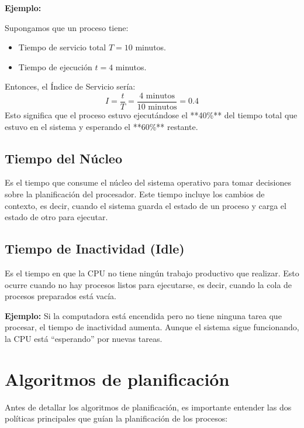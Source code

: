 \textbf{Ejemplo:}

Supongamos que un proceso tiene:
\begin{itemize}
	\item Tiempo de servicio total \( T = 10 \) minutos.
	\item Tiempo de ejecución \( t = 4 \) minutos.
\end{itemize}

Entonces, el Índice de Servicio sería:
\[
I = \frac{t}{T} = \frac{4 \text{ minutos}}{10 \text{ minutos}} = 0.4
\]
Esto significa que el proceso estuvo ejecutándose el **40\%** del tiempo total que estuvo en el sistema y esperando el **60\%** restante.




\subsection{Tiempo del Núcleo}
Es el tiempo que consume el núcleo del sistema operativo para tomar decisiones sobre la planificación del procesador. Este tiempo incluye los cambios de contexto, es decir, cuando el sistema guarda el estado de un proceso y carga el estado de otro para ejecutar.

\subsection{Tiempo de Inactividad (Idle)}
Es el tiempo en que la CPU no tiene ningún trabajo productivo que realizar. Esto ocurre cuando no hay procesos listos para ejecutarse, es decir, cuando la cola de procesos preparados está vacía.

\textbf{Ejemplo:} Si la computadora está encendida pero no tiene ninguna tarea que procesar, el tiempo de inactividad aumenta. Aunque el sistema sigue funcionando, la CPU está ``esperando'' por nuevas tareas.



\section{Algoritmos de planificación}

Antes de detallar los algoritmos de planificación, es importante entender las dos políticas principales que guían la planificación de los procesos:


